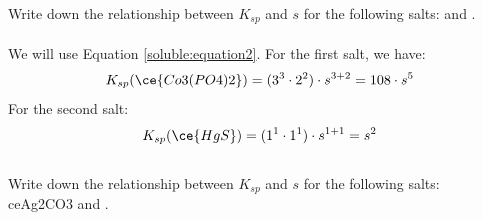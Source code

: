 \documentclass[main.tex]{subfiles}
\newcommand\chapterlabel{soluble}
\begin{document}
\begin{description}
\begin{example} %
Write down the relationship between $K_{sp}$ and $s$ for the following salts:  and .
\\
\\
We will use Equation \ref{\chapterlabel:equation2}. For the first salt, we have:
\[K_{sp}(\ce{Co3(PO4)2})=(3^3\cdot 2^2)\cdot s^{3+2}=108\cdot s^5\]
For the second salt:
\[K_{sp}(\ce{HgS})=(1^1\cdot 1^1)\cdot s^{1+1}= s^2\]
\faDiamond\ \\
Write down the relationship between $K_{sp}$ and $s$ for the following salts: \\ce{Ag2CO3} and .\\
\end{example}%


\end{description}
\end{document}
